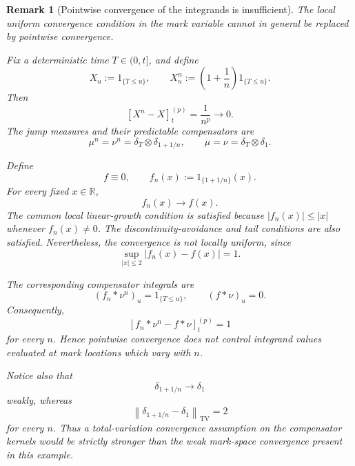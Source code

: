 \documentclass[a4paper,10pt]{article}
\newtheorem{rema}[thm]{Remark}
\begin{document}
\begin{rema}[Pointwise convergence of the integrands is insufficient]
The local uniform convergence condition in the mark variable cannot
in general be replaced by pointwise convergence.

Fix a deterministic time \(T\in(0,t]\), and define
\[
        X_u:=1_{\{T\le u\}},
        \qquad
        X_u^n
        :=
        \left(1+\frac1n\right)1_{\{T\le u\}}.
\]
Then
\[
        [X^n-X]^{(p)}_t
        =
        \frac1{n^p}
        \longrightarrow0.
\]
The jump measures and their predictable compensators are
\[
        \mu^n=\nu^n
        =
        \delta_T\otimes\delta_{1+1/n},
        \qquad
        \mu=\nu
        =
        \delta_T\otimes\delta_1.
\]

Define
\[
        f\equiv0,
        \qquad
        f_n(x):=1_{\{1+1/n\}}(x).
\]
For every fixed \(x\in\mathbb R\),
\[
        f_n(x)\longrightarrow f(x).
\]
The common local linear-growth condition is satisfied because
$
        |f_n(x)|\le |x|
$
whenever \(f_n(x)\ne0\). The discontinuity-avoidance and tail
conditions are also satisfied. Nevertheless, the convergence is not
locally uniform, since
\[
        \sup_{|x|\le2}|f_n(x)-f(x)|=1.
\]

The corresponding compensator integrals are
\[
        (f_n*\nu^n)_u=1_{\{T\le u\}},
        \qquad
        (f*\nu)_u=0.
\]
Consequently,
\[
        [f_n*\nu^n-f*\nu]^{(p)}_t=1
\]
for every \(n\). Hence pointwise convergence does not control
integrand values evaluated at mark locations which vary with \(n\).

Notice also that
\[
        \delta_{1+1/n}
        \longrightarrow
        \delta_1
\]
weakly, whereas
\[
        \left\lVert
        \delta_{1+1/n}-\delta_1
        \right\rVert_{\mathrm{TV}}
        =
        2
\]
for every \(n\). Thus a total-variation convergence assumption on the
compensator kernels would be strictly stronger than the weak
mark-space convergence present in this example.
\end{rema}
\end{document}
